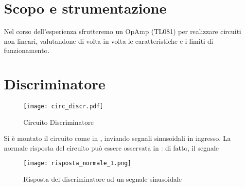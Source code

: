 \section{Scopo e strumentazione}

Nel corso dell'esperienza sfrutteremo un OpAmp (TL081) per realizzare circuiti non lineari, valutandone di volta in volta le caratteristiche e i limiti di funzionamento.

\section{Discriminatore}

\begin{figure}[h]
	\texttt{[image: circ\_discr.pdf]}
	\caption{Circuito Discriminatore}
	\label{f:discr}
\end{figure}

Si è montato il circuito come in , inviando segnali sinusoidali in ingresso. La normale risposta del circuito può essere osservata in : di fatto, il segnale 

\begin{figure}
	\texttt{[image: risposta\_normale\_1.png]}
	\caption{Risposta del discriminatore ad un segnale sinusoidale}
	\label{f:discr_normale}
\end{figure}
